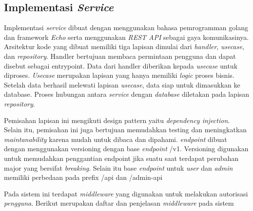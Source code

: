 \subsection{Implementasi \textit{Service}}
\label{subsec:implementasi-service}

Implementasi \textit{service} dibuat dengan menggunakan bahasa pemrogramman golang dan framework \textit{Echo} serta menggunakan \textit{REST API} sebagai gaya komunikasinya. Arsitektur kode yang dibuat memiliki tiga lapisan dimulai dari \textit{handler}, \textit{usecase}, dan \textit{repository}. Handler bertujuan membaca permintaan pengguna dan dapat disebut sebagai entrypoint. Data dari handler diberikan kepada \textit{usecase} untuk diproses. \textit{Usecase} merupakan lapisan yang hanya memiliki \textit{logic} proses bisnis. Setelah data berhasil melewati lapisan \textit{usecase}, data siap untuk dimasukkan ke database. Proses hubungan antara \textit{service} dengan \textit{database} diletakan pada lapisan \textit{repository}.

Pemisahan lapisan ini mengikuti design pattern yaitu \textit{dependency injection}. Selain itu, pemisahan ini juga bertujuan memudahkan testing dan meningkatkan \textit{maintanability} karena mudah untuk dibaca dan dipahami. \textit{endpoint} dibuat dengan menggunakan versioning dengan base \textit{endpoint} /v1. Versioning digunakan untuk memudahkan penggantian endpoint jika suatu saat terdapat perubahan major yang bersifat \textit{breaking}. Selain itu base \textit{endpoint} untuk \textit{user} dan \textit{admin} memiliki perbedaan pada prefix /api dan /admin-api

Pada sistem ini terdapat \textit{middleware} yang digunakan untuk melakukan autorisasi \textit{pengguna}. Berikut merupakan daftar dan penjelasan \textit{middleware} pada sistem

